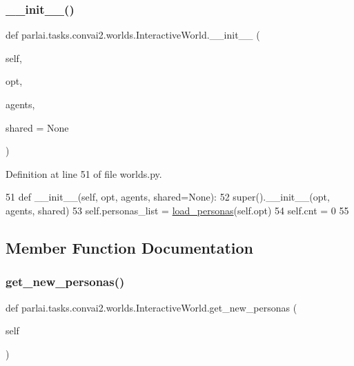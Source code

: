 \subsubsection{\texorpdfstring{\+\_\+\+\_\+init\+\_\+\+\_\+()}{\_\_init\_\_()}}
{\footnotesize\ttfamily def parlai.\+tasks.\+convai2.\+worlds.\+Interactive\+World.\+\_\+\+\_\+init\+\_\+\+\_\+ (\begin{DoxyParamCaption}\item[{}]{self,  }\item[{}]{opt,  }\item[{}]{agents,  }\item[{}]{shared = {\ttfamily None} }\end{DoxyParamCaption})}



Definition at line 51 of file worlds.\+py.


\begin{DoxyCode}
51     \textcolor{keyword}{def }\_\_init\_\_(self, opt, agents, shared=None):
52         super().\_\_init\_\_(opt, agents, shared)
53         self.personas\_list = \hyperlink{namespaceparlai_1_1tasks_1_1convai2_1_1worlds_a61a758b7cb43183397d002f7f203f586}{load\_personas}(self.opt)
54         self.cnt = 0
55 
\end{DoxyCode}


\subsection{Member Function Documentation}
\mbox{\label{classparlai_1_1tasks_1_1convai2_1_1worlds_1_1InteractiveWorld_acac91ca0d5cfc546437874e2f6d801a3}} 
\subsubsection{\texorpdfstring{get\+\_\+new\+\_\+personas()}{get\_new\_personas()}}
{\footnotesize\ttfamily def parlai.\+tasks.\+convai2.\+worlds.\+Interactive\+World.\+get\+\_\+new\+\_\+personas (\begin{DoxyParamCaption}\item[{}]{self }\end{DoxyParamCaption})}



